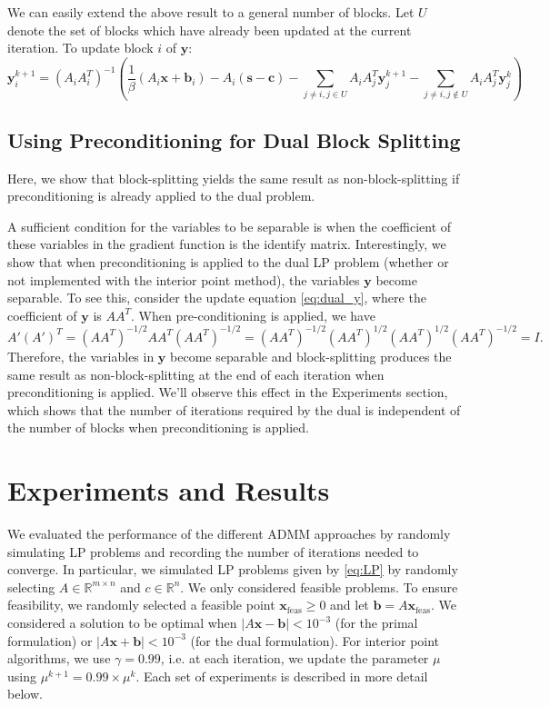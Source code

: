 \documentclass{article}
\begin{document}
We can easily extend the above result to a general number of blocks. Let $U$ denote the set of blocks which have already been updated at the current iteration. To update block $i$ of $\mathbf{y}$:
\[
\mathbf{y}_{i}^{k+1}=\left(A_{i}A_{i}^{T}\right)^{-1}\left(\frac{1}{\beta}\left(A_{i}\mathbf{x}+\mathbf{b}_{i}\right)-A_{i}\left(\mathbf{s}-\mathbf{c}\right)-\sum_{j\neq i,j\in U}A_{i}A_{j}^{T}\mathbf{y}_{j}^{k+1}-\sum_{j\neq i,j\notin U}A_{i}A_{j}^{T}\mathbf{y}_{j}^{k}\right)
\]
\vspace{0.1in}
{ \subsection*{Using Preconditioning for Dual Block Splitting}
Here, we show that block-splitting yields the same result as non-block-splitting if preconditioning is already applied to the dual problem. 

A sufficient condition for the variables to be separable is when the coefficient of these variables in the gradient function is the identify matrix. Interestingly, we show that when preconditioning is applied to the dual LP problem (whether or not implemented with the interior point method), the variables $\mathbf{y}$ become separable. To see this, consider the update equation \eqref{eq:dual_y}, where the coefficient of $\mathbf{y}$ is $A A^T$. When pre-conditioning is applied, we have
\[
A' (A')^T  = (AA^T )^{-1/2}A A^T (AA^T )^{-1/2} =  (AA^T )^{-1/2}(AA^T )^{1/2} (AA^T )^{1/2} (AA^T )^{-1/2}  = I.
\]
Therefore, the variables in $\mathbf{y}$ become separable and block-splitting produces the same result as non-block-splitting at the end of each iteration when preconditioning is applied. We'll observe this effect in the Experiments section, which shows that the number of iterations required by the dual is independent of the number of blocks when preconditioning is applied.

\newpage
\section{Experiments and Results}

We evaluated the performance of the different ADMM approaches by randomly simulating LP problems and recording the number of iterations needed to converge. In particular, we simulated LP problems given by \eqref{eq:LP} by randomly selecting $A\in\mathbb{R}^{m \times n}$ and $c\in\mathbb{R}^{n}$. We only considered feasible problems. To ensure feasibility, we randomly selected a feasible point $\mathbf{x}_{\text{feas}}\geq0$ and let $\mathbf{b}=A\mathbf{x}_{\text{feas}}$. We considered a solution to be optimal when $\left|A\mathbf{x}-\mathbf{b}\right|<10^{-3}$ (for the primal formulation) or $\left|A\mathbf{x}+\mathbf{b}\right|<10^{-3}$ (for the dual formulation). For interior point algorithms, we use $\gamma=0.99$, i.e. at each iteration, we update the parameter $\mu$ using $\mu^{k+1} = 0.99 \times \mu^k$. Each set of experiments is described in more detail below.

}
\end{document}
